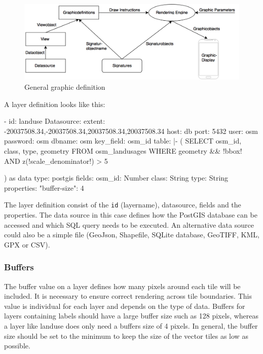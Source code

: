 \begin{figure}[H]
\centering
  \includegraphics[width=1\textwidth]{images/graphic_definition.png}
  \caption{General graphic definition}
\end{figure}

A layer definition looks like this:
\begin{yamlcode}
- id: landuse
Datasource:
    extent: -20037508.34,-20037508.34,20037508.34,20037508.34
    host: db
    port: 5432
    user: osm
    password: osm
    dbname: osm
    key_field: osm_id
    table: |-
        (
            SELECT osm_id, class, type, geometry
            FROM osm_landusages
            WHERE geometry && !bbox!
            AND z(!scale_denominator!) > 5
        
        ) as data
    type: postgis
fields:
    osm_id: Number
    class: String
    type: String
properties:
    "buffer-size": 4
\end{yamlcode}
The layer definition consist of the \texttt{id} (layername), datasource, fields and the properties. The data source in this case defines how the PostGIS database can be accessed and which SQL query needs to be executed. An alternative data source could also be a simple file (GeoJson, Shapefile, SQLite database, GeoTIFF, KML, GPX or CSV).

\subsubsection{Buffers}\label{buffers}
The buffer value on a layer defines how many pixels around each tile will be included. It is necessary to ensure correct rendering across tile boundaries. This value is individual for each layer and depends on the type of data. Buffers for layers containing labels should have a large buffer size such as 128 pixels, whereas a layer like landuse does only need a buffers size of 4 pixels. In general, the buffer size should be set to the minimum to keep the size of the vector tiles as low as possible.\cite{89_mapbox.com_2015}

